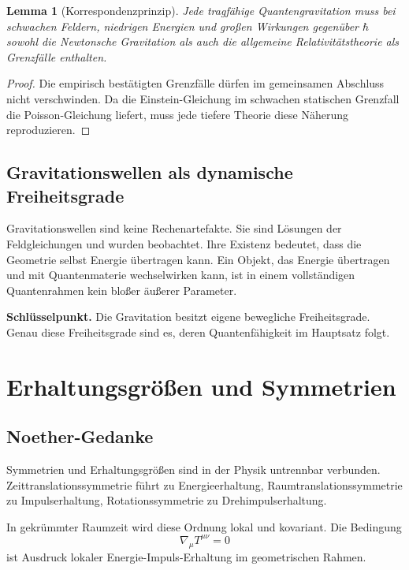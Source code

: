 \documentclass[11pt,a4paper,openany]{book}
\newtheorem{lemma}{Lemma}[chapter]
\theoremstyle{remark}
\begin{document}
\begin{lemma}[Korrespondenzprinzip]
Jede tragfähige Quantengravitation muss bei schwachen Feldern, niedrigen Energien und großen Wirkungen gegenüber $\hbar$ sowohl die Newtonsche Gravitation als auch die allgemeine Relativitätstheorie als Grenzfälle enthalten.
\end{lemma}
\begin{proof}
Die empirisch bestätigten Grenzfälle dürfen im gemeinsamen Abschluss nicht verschwinden. Da die Einstein-Gleichung im schwachen statischen Grenzfall die Poisson-Gleichung liefert, muss jede tiefere Theorie diese Näherung reproduzieren.
\end{proof}

\section{Gravitationswellen als dynamische Freiheitsgrade}
Gravitationswellen sind keine Rechenartefakte. Sie sind Lösungen der Feldgleichungen und wurden beobachtet. Ihre Existenz bedeutet, dass die Geometrie selbst Energie übertragen kann. Ein Objekt, das Energie übertragen und mit Quantenmaterie wechselwirken kann, ist in einem vollständigen Quantenrahmen kein bloßer äußerer Parameter.

\begin{merkkasten}
\textbf{Schlüsselpunkt.} Die Gravitation besitzt eigene bewegliche Freiheitsgrade. Genau diese Freiheitsgrade sind es, deren Quantenfähigkeit im Hauptsatz folgt.
\end{merkkasten}

\chapter{Erhaltungsgrößen und Symmetrien}
\section{Noether-Gedanke}
Symmetrien und Erhaltungsgrößen sind in der Physik untrennbar verbunden. Zeittranslationssymmetrie führt zu Energieerhaltung, Raumtranslationssymmetrie zu Impulserhaltung, Rotationssymmetrie zu Drehimpulserhaltung.

In gekrümmter Raumzeit wird diese Ordnung lokal und kovariant. Die Bedingung
\begin{equation}
\nabla_\mu T^{\mu\nu}=0
\end{equation}
ist Ausdruck lokaler Energie-Impuls-Erhaltung im geometrischen Rahmen.
\end{document}
